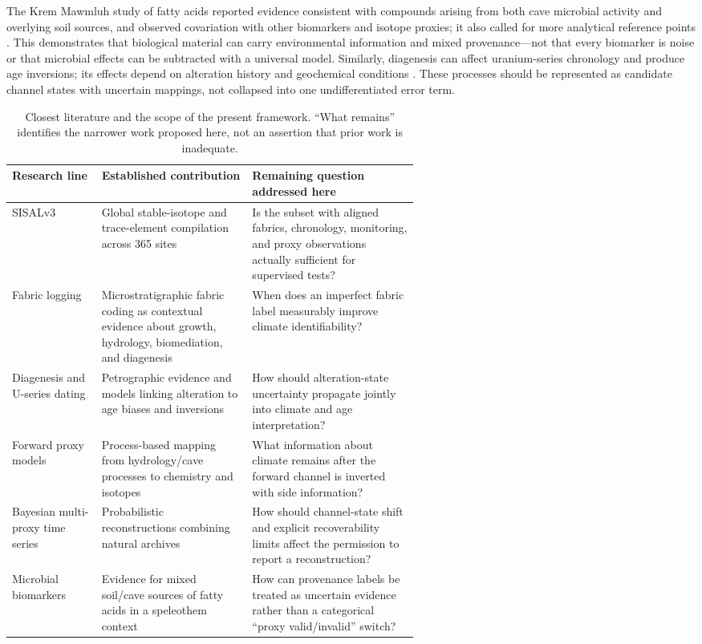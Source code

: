 \documentclass[11pt,a4paper]{article}
\begin{document}
The Krem Mawmluh study of fatty acids reported evidence consistent with compounds arising from both cave microbial activity and overlying soil sources, and observed covariation with other biomarkers and isotope proxies; it also called for more analytical reference points \citep{Kalpana2021}. This demonstrates that biological material can carry environmental information and mixed provenance—not that every biomarker is noise or that microbial effects can be subtracted with a universal model. Similarly, diagenesis can affect uranium-series chronology and produce age inversions; its effects depend on alteration history and geochemical conditions \citep{Scholz2014}. These processes should be represented as candidate channel states with uncertain mappings, not collapsed into one undifferentiated error term.

\begin{table}[!htbp]\centering\small
\caption{Closest literature and the scope of the present framework. “What remains” identifies the narrower work proposed here, not an assertion that prior work is inadequate.}\label{tab:prior}
\begin{tabularx}{\linewidth}{p{0.22\linewidth}p{0.37\linewidth}X}\toprule
Research line & Established contribution & Remaining question addressed here \\\midrule
SISALv3 \citep{Kaushal2024SISALv3} & Global stable-isotope and trace-element compilation across 365 sites & Is the subset with aligned fabrics, chronology, monitoring, and proxy observations actually sufficient for supervised tests? \\
Fabric logging \citep{Frisia2015} & Microstratigraphic fabric coding as contextual evidence about growth, hydrology, biomediation, and diagenesis & When does an imperfect fabric label measurably improve climate identifiability? \\
Diagenesis and U-series dating \citep{Scholz2014} & Petrographic evidence and models linking alteration to age biases and inversions & How should alteration-state uncertainty propagate jointly into climate and age interpretation? \\
Forward proxy models \citep{CaveCalc2018,PSMAssessment2021} & Process-based mapping from hydrology/cave processes to chemistry and isotopes & What information about climate remains after the forward channel is inverted with side information? \\
Bayesian multi-proxy time series \citep{Cahill2023} & Probabilistic reconstructions combining natural archives & How should channel-state shift and explicit recoverability limits affect the permission to report a reconstruction? \\
Microbial biomarkers \citep{Kalpana2021} & Evidence for mixed soil/cave sources of fatty acids in a speleothem context & How can provenance labels be treated as uncertain evidence rather than a categorical “proxy valid/invalid” switch? \\
\bottomrule\end{tabularx}\end{table}
\end{document}
